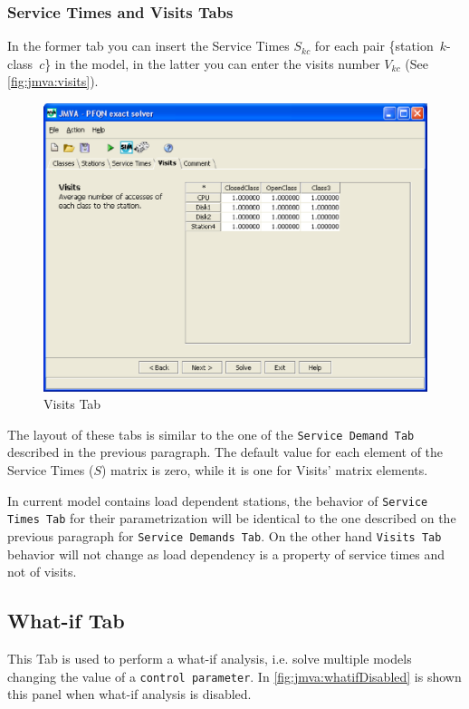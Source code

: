 \subsubsection{Service Times and Visits Tabs}
In the former tab you can insert the Service Times $S_{kc}$ for each
pair \{station~$k$-class~$c$\} in the model, in the latter you can
enter the visits number $V_{kc}$ (See \autoref{fig:jmva:visits}).

\begin{figure}[htbp]
    \begin{center}
        \includegraphics[scale=.5]{img/jmva/visits}
    \end{center}
    \caption{Visits Tab}
    \label{fig:jmva:visits}
\end{figure}

The layout of these tabs is similar to the one of the
\texttt{Service Demand Tab} described in the previous paragraph. The
default value for each element of the Service Times ($S$) matrix is
zero, while it is one for Visits' matrix elements.

In current model contains load dependent stations, the behavior of
\texttt{Service Times Tab} for their parametrization will be
identical to the one described on the previous paragraph for
\texttt{Service Demands Tab}. On the other hand \texttt{Visits Tab}
behavior will not change as load dependency is a property of service
times and not of visits.

\subsection{What-if Tab}
\label{sec:jmva:whatif} This Tab is used to perform a what-if
analysis, i.e. solve multiple models changing the value of a
\texttt{control parameter}. In \autoref{fig:jmva:whatifDisabled} is
shown this panel when what-if analysis is disabled.

